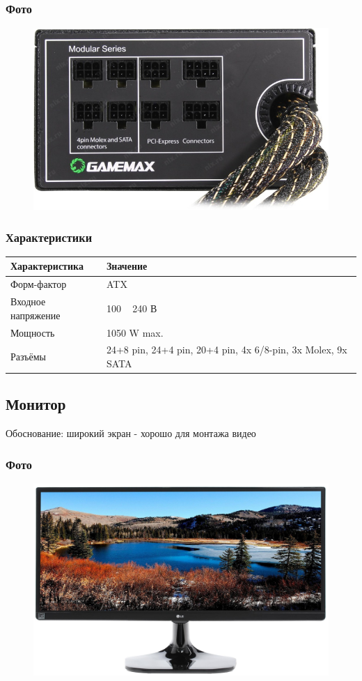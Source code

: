 \documentclass[a4paper]{article}
\begin{document}
\subsubsection{Фото}
\begin{figure}[H]
\centering
\includegraphics[scale=0.3]{power.jpg} 
\end{figure}
\subsubsection{Характеристики}
\begin{table}[H]
\centering
\begin{tabular}{|l|l|}
\hline
Характеристика & Значение \\
\hline
Форм-фактор & ATX \\
Входное напряжение & 100 ~ 240 В \\
Мощность & 	1050 W max. \\
Разъёмы & 24+8 pin, 24+4 pin, 20+4 pin, 4x 6/8-pin, 3x Molex, 9x SATA \\
\hline
\end{tabular} 
\end{table}

\subsection{Монитор}
Обоснование: широкий экран - хорошо для монтажа видео
\subsubsection{Фото}
\begin{figure}[H]
\centering
\includegraphics[scale=0.1]{mon.jpg} 
\end{figure}
\end{document}
